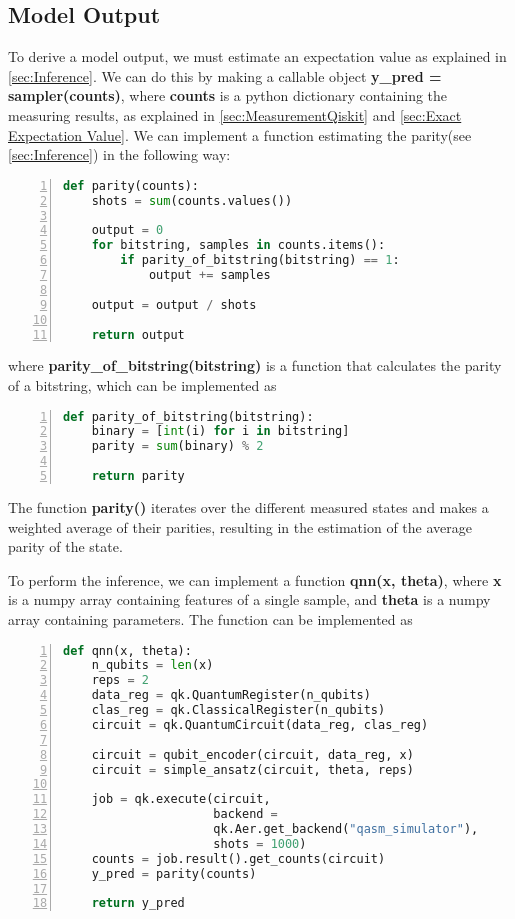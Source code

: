 \subsection{Model Output}\label{sec:InferenceImplementation}
To derive a model output, we must estimate an expectation value as explained in \cref{sec:Inference}. We can do this by making a callable object \textbf{y\_pred = sampler(counts)}, where \textbf{counts} is a python dictionary containing the measuring results, as explained in \cref{sec:MeasurementQiskit} and \cref{sec:Exact Expectation Value}. We can implement a function estimating the parity(see \cref{sec:Inference}) in the following way:

\begin{lstlisting}[language=python, numbers=left]
def parity(counts):
    shots = sum(counts.values())
    
    output = 0
    for bitstring, samples in counts.items():
        if parity_of_bitstring(bitstring) == 1:
            output += samples

    output = output / shots

    return output
\end{lstlisting}
where \textbf{parity\_of\_bitstring(bitstring)} is a function that calculates the parity of a bitstring, which can be implemented as 
\begin{lstlisting}[language=python, numbers=left]
def parity_of_bitstring(bitstring):
    binary = [int(i) for i in bitstring]
    parity = sum(binary) % 2
    
    return parity
\end{lstlisting}

The function \textbf{parity()} iterates over the different measured states and makes a weighted average of their parities, resulting in the estimation of the average parity of the state.

To perform the inference, we can implement a function \textbf{qnn(x, theta)}, where \textbf{x} is a numpy array containing features of a single sample, and \textbf{theta} is a numpy array containing parameters. The function can be implemented as 

\begin{lstlisting}[language=python, numbers=left]
def qnn(x, theta):
    n_qubits = len(x)
    reps = 2
    data_reg = qk.QuantumRegister(n_qubits)
    clas_reg = qk.ClassicalRegister(n_qubits)
    circuit = qk.QuantumCircuit(data_reg, clas_reg)
    
    circuit = qubit_encoder(circuit, data_reg, x)
    circuit = simple_ansatz(circuit, theta, reps)

    job = qk.execute(circuit, 
                     backend = 
                     qk.Aer.get_backend("qasm_simulator"),
                     shots = 1000)
    counts = job.result().get_counts(circuit)
    y_pred = parity(counts)
    
    return y_pred
\end{lstlisting}


